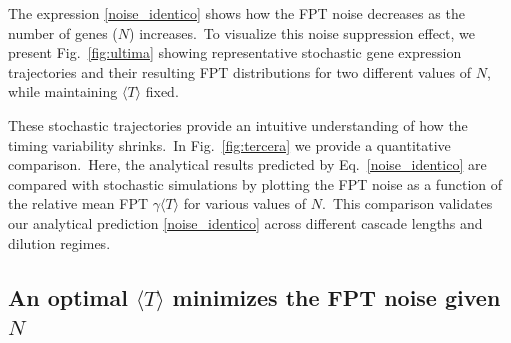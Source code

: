 \documentclass[aps,prb,reprint,superscriptaddress]{revtex4-2}
\begin{document}
The expression \eqref{noise_identico} shows how the FPT noise decreases as the number of genes ($N$) increases.~To visualize this noise suppression effect, we present Fig.~\ref{fig:ultima} showing representative stochastic gene expression trajectories and their resulting FPT distributions for two different values of $N$, while maintaining $\langle T\rangle$ fixed.



These stochastic trajectories provide an intuitive understanding of how the timing variability shrinks.~In Fig.~\ref{fig:tercera} we provide a quantitative comparison.~Here, the analytical results predicted by Eq.~\eqref{noise_identico} are compared with stochastic simulations by plotting the FPT noise as a function of the relative mean FPT $\gamma \langle T \rangle$ for various values of $N$.~This comparison validates our analytical prediction \eqref{noise_identico} across different cascade lengths and dilution regimes.

\subsection*{An optimal $\langle T\rangle$ minimizes the FPT noise given $N$}
\end{document}
